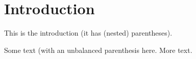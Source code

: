 \section{Introduction}
This is the introduction (it has (nested) parentheses).

Some text (with an unbalanced parenthesis \badcommand here.
More text.
